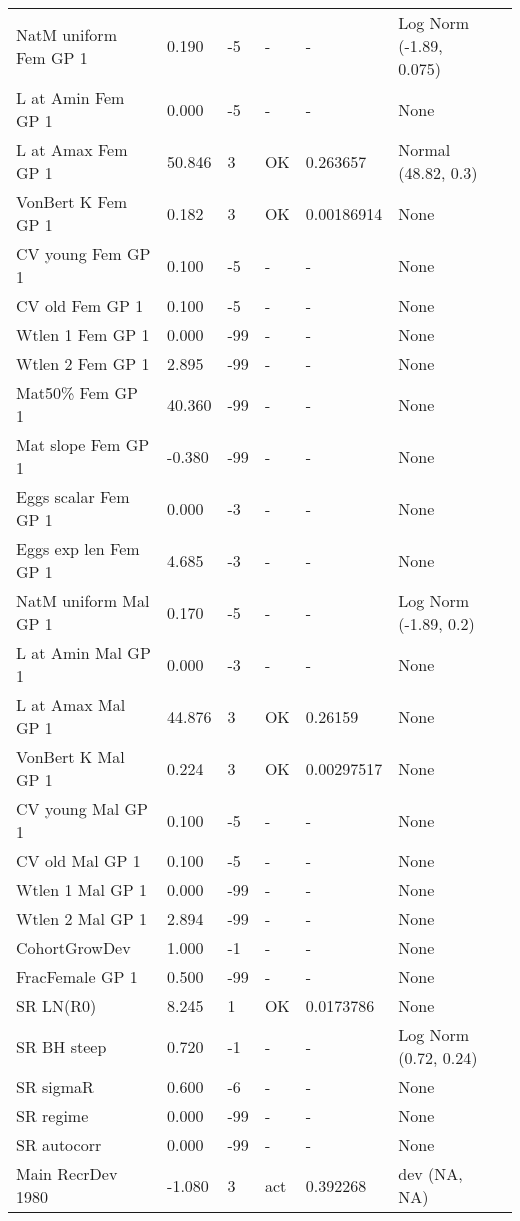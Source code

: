\documentclass[11pt,
  english,
  letterpaper,
]{article}
\begin{document}
\begin{landscape}
\begin{longtable}[t]{>{\raggedright\arraybackslash}p{6cm}lllll>{\raggedright\arraybackslash}p{4cm}}
\endfoot
\bottomrule
\endlastfoot
NatM uniform Fem GP 1 & 0.190 & -5 & - & - & Log Norm (-1.89, 0.075)\\
L at Amin Fem GP 1 & 0.000 & -5 & - & - & None\\
L at Amax Fem GP 1 & 50.846 & 3 & OK & 0.263657 & Normal (48.82, 0.3)\\
VonBert K Fem GP 1 & 0.182 & 3 & OK & 0.00186914 & None\\
CV young Fem GP 1 & 0.100 & -5 & - & - & None\\
CV old Fem GP 1 & 0.100 & -5 & - & - & None\\
Wtlen 1 Fem GP 1 & 0.000 & -99 & - & - & None\\
Wtlen 2 Fem GP 1 & 2.895 & -99 & - & - & None\\
Mat50\% Fem GP 1 & 40.360 & -99 & - & - & None\\
Mat slope Fem GP 1 & -0.380 & -99 & - & - & None\\
Eggs scalar Fem GP 1 & 0.000 & -3 & - & - & None\\
Eggs exp len Fem GP 1 & 4.685 & -3 & - & - & None\\
NatM uniform Mal GP 1 & 0.170 & -5 & - & - & Log Norm (-1.89, 0.2)\\
L at Amin Mal GP 1 & 0.000 & -3 & - & - & None\\
L at Amax Mal GP 1 & 44.876 & 3 & OK & 0.26159 & None\\
VonBert K Mal GP 1 & 0.224 & 3 & OK & 0.00297517 & None\\
CV young Mal GP 1 & 0.100 & -5 & - & - & None\\
CV old Mal GP 1 & 0.100 & -5 & - & - & None\\
Wtlen 1 Mal GP 1 & 0.000 & -99 & - & - & None\\
Wtlen 2 Mal GP 1 & 2.894 & -99 & - & - & None\\
CohortGrowDev & 1.000 & -1 & - & - & None\\
FracFemale GP 1 & 0.500 & -99 & - & - & None\\
SR LN(R0) & 8.245 & 1 & OK & 0.0173786 & None\\
SR BH steep & 0.720 & -1 & - & - & Log Norm (0.72, 0.24)\\
SR sigmaR & 0.600 & -6 & - & - & None\\
SR regime & 0.000 & -99 & - & - & None\\
SR autocorr & 0.000 & -99 & - & - & None\\
Main RecrDev 1980 & -1.080 & 3 & act & 0.392268 & dev (NA, NA)\\

\end{longtable}
\end{landscape}
\end{document}
